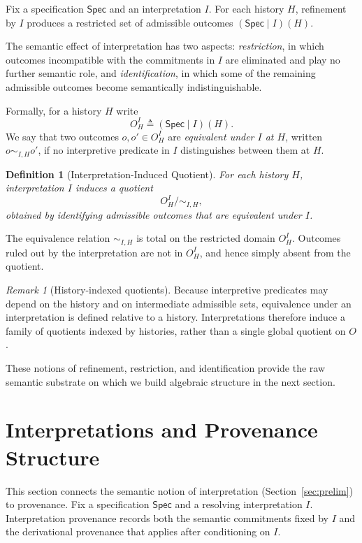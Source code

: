 \documentclass[acmsmall,nonacm]{acmart}
\newtheorem{definition}{Definition}
\theoremstyle{remark}
\newtheorem{remark}{Remark}
\numberwithin{definition}{section}
\numberwithin{theorem}{section}
\numberwithin{lemma}{section}
\numberwithin{corollary}{section}
\numberwithin{remark}{section}
\numberwithin{example}{section}
\numberwithin{observation}{section}
\numberwithin{assumption}{section}
\newcommand{\Spec}{\mathsf{Spec}}
\begin{document}
Fix a specification $\Spec$ and an interpretation $I$.
For each history $H$, refinement by $I$ produces a restricted set of admissible
outcomes $(\Spec \mid I)(H)$.

The semantic effect of interpretation has two aspects:
\emph{restriction}, in which outcomes incompatible with the commitments in $I$ are eliminated and play no further semantic role, and \emph{identification}, in which some of the remaining admissible outcomes become semantically indistinguishable.

Formally, for a history $H$ write
\[
  O_H^I \triangleq (\Spec \mid I)(H).
\]
We say that two outcomes $o,o' \in O_H^I$ are \emph{equivalent under $I$ at $H$},
written $o \sim_{I,H} o'$, if no interpretive predicate in $I$ distinguishes between them at $H$.

\begin{definition}[Interpretation-Induced Quotient]
For each history $H$, interpretation $I$ induces a quotient
\[
  O_H^I \big/ {\sim_{I,H}},
\]
obtained by identifying admissible outcomes that are equivalent under $I$.
\end{definition}

The equivalence relation $\sim_{I,H}$ is total on the restricted domain $O_H^I$.
Outcomes ruled out by the interpretation are not in $O_H^I$, and hence simply absent from the quotient.

\begin{remark}[History-indexed quotients]
Because interpretive predicates may depend on the history and on intermediate
admissible sets, equivalence under an interpretation is defined relative to a
history.
Interpretations therefore induce a family of quotients indexed by histories,
rather than a single global quotient on $O$.
\end{remark}

These notions of refinement, restriction, and identification provide the raw
semantic substrate on which we build algebraic structure in the next section.

\section{Interpretations and Provenance Structure}
\label{sec:conditional-semiring}
This section connects the semantic notion of interpretation
(Section~\ref{sec:prelim}) to provenance.
Fix a specification $\Spec$ and a resolving interpretation $I$.
Interpretation provenance records both the semantic commitments fixed by $I$ and
the derivational provenance that applies after conditioning on $I$.
\end{document}
